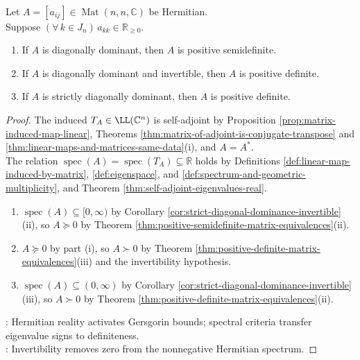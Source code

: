 \begin{corollary} \label{cor:diagonal-dominant-hermitian-positive-semidefinite} \\
Let $A=[a_{ij}]\in\operatorname{Mat}(n,n,\mathbb{C})$ be Hermitian.\\
Suppose $(\forall\,k\in J_n)\,a_{kk}\in\mathbb{R}_{\geq0}$.
\begin{enumerate}[label=(\roman*)]
\setlength{\itemsep}{0pt}
\item If $A$ is diagonally dominant, then $A$ is positive semidefinite.
\item If $A$ is diagonally dominant and invertible, then $A$ is positive definite.
\item If $A$ is strictly diagonally dominant, then $A$ is positive definite.
\end{enumerate}
\begin{proof}
The induced $T_A\in\LL(\mathbb{C}^n)$ is self-adjoint by Proposition \ref{prop:matrix-induced-map-linear}, Theorems \ref{thm:matrix-of-adjoint-is-conjugate-transpose} and \ref{thm:linear-maps-and-matrices-same-data}(i), and $A=A^*$.\\
The relation $\operatorname{spec}(A)=\operatorname{spec}(T_A)\subseteq\mathbb{R}$ holds by Definitions \ref{def:linear-map-induced-by-matrix}, \ref{def:eigenspace}, and \ref{def:spectrum-and-geometric-multiplicity}, and Theorem \ref{thm:self-adjoint-eigenvalues-real}.
\begin{enumerate}[label=(\roman*)]
\setlength{\itemsep}{0pt}
\item $\operatorname{spec}(A)\subseteq[0,\infty)$ by Corollary \ref{cor:strict-diagonal-dominance-invertible}(ii), so $A\succeq0$ by Theorem \ref{thm:positive-semidefinite-matrix-equivalences}(ii).
\item $A\succeq0$ by part (i), so $A\succ0$ by Theorem \ref{thm:positive-definite-matrix-equivalences}(iii) and the invertibility hypothesis.
\item $\operatorname{spec}(A)\subseteq(0,\infty)$ by Corollary \ref{cor:strict-diagonal-dominance-invertible}(iii), so $A\succ0$ by Theorem \ref{thm:positive-definite-matrix-equivalences}(ii).
\end{enumerate}
: Hermitian reality activates Gersgorin bounds; spectral criteria transfer eigenvalue signs to definiteness.\\
: Invertibility removes zero from the nonnegative Hermitian spectrum.
\end{proof}
\end{corollary}
